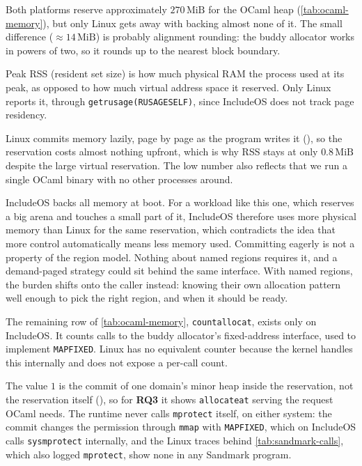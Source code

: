\documentclass[12pt]{report}
\newcommand{\fullref}[1]{\Cref{#1}}
\renewcommand{\_}{\origunderscore\allowbreak}
\begin{document}
Both platforms reserve approximately $270\,\text{MiB}$ for the OCaml heap (\cref{tab:ocaml-memory}), but only Linux gets away with backing almost none of it. The small difference ($\approx 14\,\text{MiB}$) is probably alignment rounding: the buddy allocator works in powers of two, so it rounds up to the nearest block boundary.

Peak RSS (resident set size) is how much physical RAM the process used at its peak, as opposed to how much virtual address space it reserved. Only Linux reports it, through \texttt{getrusage(RUSAGE\_SELF)}, since IncludeOS does not track page residency.

Linux commits memory lazily, page by page as the program writes it (\fullref{sssec:posix-memory}), so the reservation costs almost nothing upfront, which is why RSS stays at only $0.8\,\text{MiB}$ despite the large virtual reservation. The low number also reflects that we run a single OCaml binary with no other processes around.

IncludeOS backs all memory at boot. For a workload like this one, which reserves a big arena and touches a small part of it, IncludeOS therefore uses more physical memory than Linux for the same reservation, which contradicts the idea that more control automatically means less memory used. Committing eagerly is not a property of the region model. Nothing about named regions requires it, and a demand-paged strategy could sit behind the same interface. With named regions, the burden shifts onto the caller instead: knowing their own allocation pattern well enough to pick the right region, and when it should be ready.

The remaining row of \cref{tab:ocaml-memory}, \texttt{count\_alloc\_at}, exists only on IncludeOS. It counts calls to the buddy allocator's fixed-address interface, used to implement \texttt{MAP\_FIXED}. Linux has no equivalent counter because the kernel handles this internally and does not expose a per-call count.

The value $1$ is the commit of one domain's minor heap inside the reservation, not the reservation itself (\fullref{sec:design-ocaml}), so for \textbf{RQ3} it shows \texttt{allocate\_at} serving the request OCaml needs. The runtime never calls \texttt{mprotect} itself, on either system: the commit changes the permission through \texttt{mmap} with \texttt{MAP\_FIXED}, which on IncludeOS calls \texttt{\_\_sys\_mprotect} internally, and the Linux traces behind \cref{tab:sandmark-calls}, which also logged \texttt{mprotect}, show none in any Sandmark program.
\end{document}
